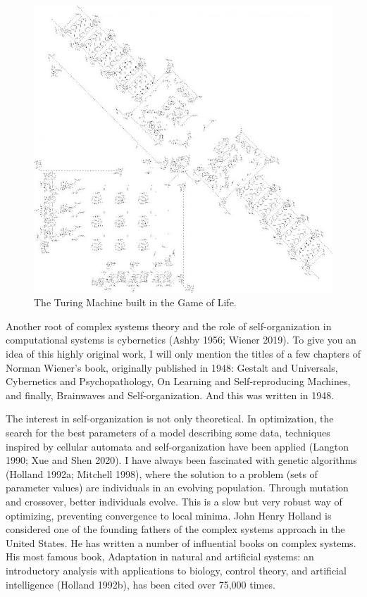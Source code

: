 \documentclass[
  a4paper,
  DIV=11,
  numbers=noendperiod,
  oneside]{scrreprt}
\begin{document}
\begin{figure}

{\centering \includegraphics{media/ch5n/image4.jpg}

}

\caption{\label{fig-ch5n-img4-old-42}The Turing Machine built in the
Game of Life.}

\end{figure}

Another root of complex systems theory and the role of self-organization
in computational systems is cybernetics (Ashby 1956; Wiener 2019). To
give you an idea of this highly original work, I will only mention the
titles of a few chapters of Norman Wiener's book, originally published
in 1948: Gestalt and Universals, Cybernetics and Psychopathology, On
Learning and Self-reproducing Machines, and finally, Brainwaves and
Self-organization. And this was written in 1948.

The interest in self-organization is not only theoretical. In
optimization, the search for the best parameters of a model describing
some data, techniques inspired by cellular automata and
self-organization have been applied (Langton 1990; Xue and Shen 2020). I
have always been fascinated with genetic algorithms (Holland 1992a;
Mitchell 1998), where the solution to a problem (sets of parameter
values) are individuals in an evolving population. Through mutation and
crossover, better individuals evolve. This is a slow but very robust way
of optimizing, preventing convergence to local minima. John Henry
Holland is considered one of the founding fathers of the complex systems
approach in the United States. He has written a number of influential
books on complex systems. His most famous book, Adaptation in natural
and artificial systems: an introductory analysis with applications to
biology, control theory, and artificial intelligence (Holland 1992b),
has been cited over 75,000 times.
\end{document}
